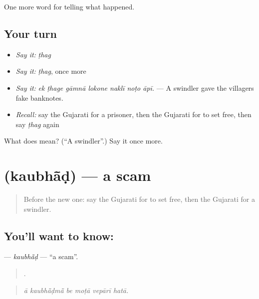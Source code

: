 \begin{grammarlens}[title={What you've built}]
One more word for telling what happened.
\end{grammarlens}

\subsection*{Your turn}
\begin{itemize}
\raggedright
  \item \emph{Say it:} \emph{ṭhag}
  \item \emph{Say it:} \emph{ṭhag}, once more
  \item \emph{Say it:} \emph{ek ṭhage gāmnā lokone naklī noṭo āpī.} — A swindler gave the villagers fake banknotes.
  \item \emph{Recall:} say the Gujarati for a prisoner, then the Gujarati for to set free, then say \emph{ṭhag} again
\end{itemize}

\begin{tcolorbox}[breakable,colback=teal!4,colframe=teal!35!black,title={Before you move on}]
What does  mean? (\textquotedblleft{}A swindler\textquotedblright{}.) Say it once more.
\end{tcolorbox}
\section[\texorpdfstring{\gu{કૌભાંડ} (kaubhā̃ḍ)}{કૌભાંડ (kaubhā̃ḍ)}]{ (kaubhā̃ḍ) — a scam}

\label{lesson:GU-C292-kaubhad}



\begin{quote}
Before the new one: say the Gujarati for to set free, then the Gujarati for a swindler.
\end{quote}

\subsection*{You'll want to know: }
\textbf{} — \emph{kaubhā̃ḍ} — \textquotedblleft{}a scam\textquotedblright{}.

\begin{quote}
     .
\end{quote}

\begin{quote}
\emph{ā kaubhā̃ḍmā̃ be moṭā vepārī hatā.}
\end{quote}

